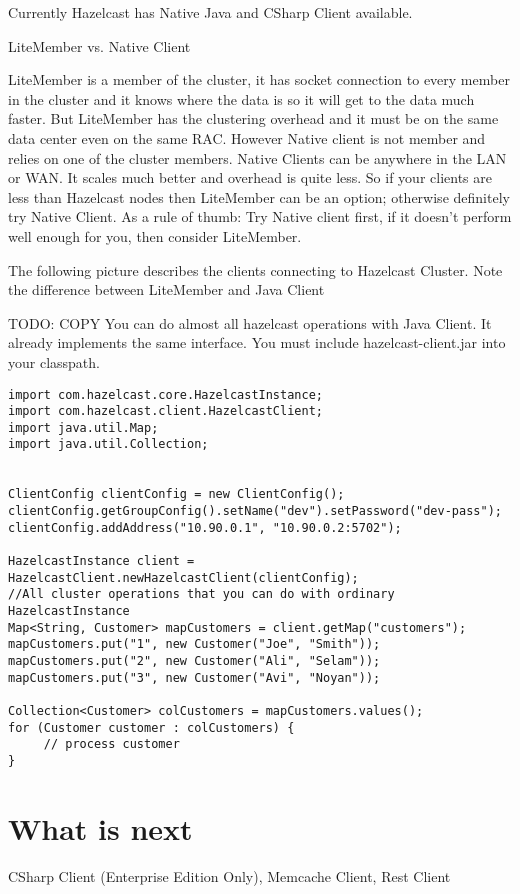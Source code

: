 Currently Hazelcast has Native Java and CSharp Client available.

LiteMember vs. Native Client

LiteMember is a member of the cluster, it has socket connection to every member in the cluster and it knows where the data is so it will get to the data much faster. But LiteMember has the clustering overhead and it must be on the same data center even on the same RAC. However Native client is not member and relies on one of the cluster members. Native Clients can be anywhere in the LAN or WAN. It scales much better and overhead is quite less. So if your clients are less than Hazelcast nodes then LiteMember can be an option; otherwise definitely try Native Client. As a rule of thumb: Try Native client first, if it doesn't perform well enough for you, then consider LiteMember.

The following picture describes the clients connecting to Hazelcast Cluster. Note the difference between LiteMember and Java Client

TODO: COPY
You can do almost all hazelcast operations with Java Client. It already implements the same interface. You must include hazelcast-client.jar into your classpath.

\begin{verbatim}
import com.hazelcast.core.HazelcastInstance;
import com.hazelcast.client.HazelcastClient;
import java.util.Map;
import java.util.Collection;


ClientConfig clientConfig = new ClientConfig();
clientConfig.getGroupConfig().setName("dev").setPassword("dev-pass");
clientConfig.addAddress("10.90.0.1", "10.90.0.2:5702");

HazelcastInstance client = HazelcastClient.newHazelcastClient(clientConfig);
//All cluster operations that you can do with ordinary HazelcastInstance
Map<String, Customer> mapCustomers = client.getMap("customers");
mapCustomers.put("1", new Customer("Joe", "Smith"));
mapCustomers.put("2", new Customer("Ali", "Selam"));
mapCustomers.put("3", new Customer("Avi", "Noyan"));

Collection<Customer> colCustomers = mapCustomers.values();
for (Customer customer : colCustomers) {
     // process customer
}
\end{verbatim}


\section{What is next}
 CSharp Client (Enterprise Edition Only), Memcache Client, Rest Client